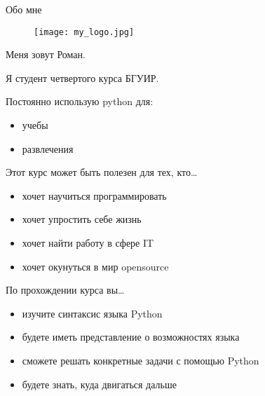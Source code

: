 \documentclass[hyperref={pdftex,unicode}]{beamer}
\begin{document}
\begin{frame}
  \maketitle
\end{frame}

\begin{frame}{Обо мне}
  \begin{minipage}{0.3\linewidth}
    \begin{figure}[H]
      \texttt{[image: my\_logo.jpg]}
    \end{figure}
  \end{minipage}
  \hfill
  \begin{minipage}{0.6\linewidth}
    Меня зовут Роман. 
    
    Я студент четвертого курса БГУИР.

    Постоянно использую python для:
    \begin{itemize}
      \item учебы
      \item развлечения
    \end{itemize}
  \end{minipage}
\end{frame}

\begin{frame}{Этот курс может быть полезен для тех, кто\dots}
  \begin{itemize}
    \item хочет научиться программировать
    \item хочет упростить себе жизнь
    \item хочет найти работу в сфере IT
    \item хочет окунуться в мир opensource
  \end{itemize}
\end{frame}

\begin{frame}{По прохождении курса вы\dots}
  \begin{itemize}
    \item изучите синтаксис языка Python
    \item будете иметь представление о возможностях языка
    \item сможете решать конкретные задачи с помощью Python
    \item будете знать, куда двигаться дальше
  \end{itemize}
\end{frame}
\end{document}
